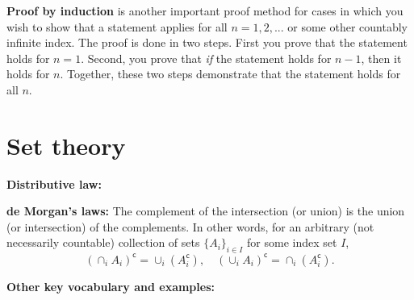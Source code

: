 \documentclass{article}
\begin{document}
\textbf{Proof by induction} is another important proof method for cases in which you wish to show that a statement applies for all $n = 1, 2, ...$ or some other countably infinite index. The proof is done in two steps. First you prove that the statement holds for $n=1$. Second, you prove that \textit{if} the statement holds for $n-1$, then it holds for $n$. Together, these two steps demonstrate that the statement holds for all $n$.



\section*{Set theory}

\large \textbf{Distributive law:}

\large \textbf{de Morgan's laws:} The complement of the intersection (or union) is the union (or intersection) of the complements. In other words, for an arbitrary (not necessarily countable) collection of sets $\{A_i\}_{i\in I}$ for some index set $I$, \[\left(\cap_i A_i\right)^\mathsf{c} = \cup_i \left(A_i^\mathsf{c}\right), \quad \left(\cup_i A_i\right)^\mathsf{c} = \cap_i \left(A_i^\mathsf{c}\right).\]

\large \textbf{Other key vocabulary and examples:}
\end{document}
